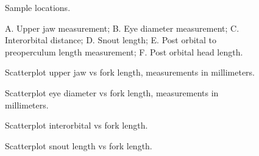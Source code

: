 \documentclass[12pt]{article}\usepackage[]{graphicx}\usepackage[]{color}
\begin{document}
\begin{figure}[htb]

{\centering {} 

}

\caption{Sample locations.}\label{fig:figure1}
\end{figure}

\begin{figure}[htb]

{\centering {} 

}

\caption{A. Upper jaw measurement; B. Eye diameter measurement; C. Interorbital distance; D. Snout length; E. Post orbital to preoperculum length measurement; F. Post orbital head length.}\label{fig:figure2}
\end{figure}

\begin{figure}[htb]

{\centering {} 

}

\caption{Scatterplot upper jaw vs fork length, measurements in millimeters.}\label{fig:figure3}
\end{figure}

\begin{figure}[htb]

{\centering {} 

}

\caption{Scatterplot eye diameter vs fork length, measurements in millimeters.}\label{fig:figure4}
\end{figure}

\begin{figure}[htb]

{\centering {} 

}

\caption{Scatterplot interorbital vs fork length.}\label{fig:figure5}
\end{figure}

\begin{figure}[htb]

{\centering {} 

}

\caption{Scatterplot snout length vs fork length.}\label{fig:figure6}
\end{figure}
\end{document}
